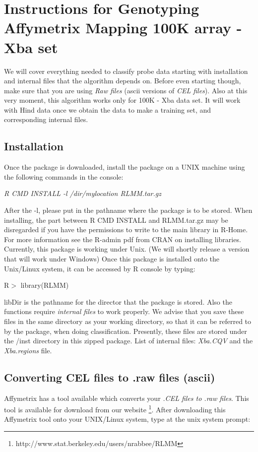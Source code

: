 \documentclass[12pt]{article}
\begin{document}
\section{Instructions for Genotyping Affymetrix Mapping 100K array - Xba set}

We will cover everything needed to classify probe data starting with installation and internal files that the algorithm depends on.
Before even starting though, make sure that you are using {\it Raw files} (ascii versions of {\it CEL files}). Also at this very 
moment, this algorithm works only for 100K - Xba data set. It will work with Hind data once we obtain the data to make a training set,
and corresponding internal files.

\subsection{Installation}
Once the package is downloaded, install the package on a UNIX machine using the following commands in the console:

\medskip
\noindent
{\it R CMD INSTALL -l /dir/mylocation RLMM.tar.gz}
\medskip

\noindent
After the -l, please put in the pathname where the package is to be stored. When installing, the part between R CMD INSTALL and
RLMM.tar.gz may be disregarded if you have the permissions to write to the main library in R-Home. For more information
see the R-admin pdf from CRAN on installing libraries. Currently, this package is working under Unix.
(We will shortly release a version that will work under Windows) Once this package is installed onto the Unix/Linux system, 
it can be accessed by R console by typing:

\medskip
R$>$ library(RLMM)
\medskip

\noindent
libDir is the pathname for the director that the package is stored. Also the functions require {\it internal files} to work properly. 
We advise that you save these files in the same directory as your working directory, so that it can be referred to by the package,
when doing classification. Presently, these files are stored under the /inst directory in this zipped package.
List of internal files: {\it Xba.CQV} and the {\it Xba.regions} file.

\subsection{Converting CEL files to .raw files (ascii)}
Affymetrix has a tool available which converts your {\it .CEL files to .raw files}. This tool is available for download from our 
website {\footnote {http://www.stat.berkeley.edu/users/nrabbee/RLMM}}. After downloading this Affymetrix tool 
onto your UNIX/Linux system, type at the unix system prompt:
\end{document}
